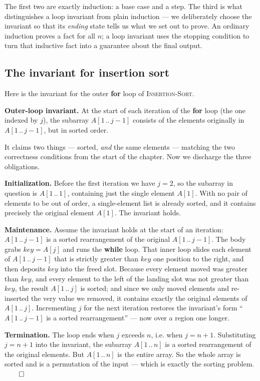 The first two are exactly induction: a base case and a step. The third is what
distinguishes a loop invariant from plain induction --- we deliberately choose the
invariant so that its \emph{ending} state tells us what we set out to prove. An
ordinary induction proves a fact for all $n$; a loop invariant uses the stopping
condition to turn that inductive fact into a guarantee about the final output.

\subsection{The invariant for insertion sort}

Here is the invariant for the outer \textbf{for} loop of \textsc{Insertion-Sort}.

\begin{formalbox}
\textbf{Outer-loop invariant.} At the start of each iteration of the \textbf{for} loop
(the one indexed by $j$), the subarray $A[1\,..\,j-1]$ consists of the elements
originally in $A[1\,..\,j-1]$, but in sorted order.
\end{formalbox}

It claims two things --- sorted, \emph{and} the same elements --- matching
the two correctness conditions from the start of the chapter. Now we discharge the three
obligations.

\begin{formalbox}
\textbf{Initialization.} Before the first iteration we have $j = 2$, so the subarray in
question is $A[1\,..\,1]$, containing just the single element $A[1]$. With no pair of
elements to be out of order, a single-element list is already sorted, and it contains
precisely the original element $A[1]$. The invariant holds.

\textbf{Maintenance.} Assume the invariant holds at the start of an iteration:
$A[1\,..\,j-1]$ is a sorted rearrangement of the original $A[1\,..\,j-1]$. The body
grabs $\mathit{key} = A[j]$ and runs the \textbf{while} loop. That inner loop slides
each element of $A[1\,..\,j-1]$ that is strictly greater than $\mathit{key}$ one
position to the right, and then deposits $\mathit{key}$ into the freed slot. Because
every element moved was greater than $\mathit{key}$, and every element to the left of
the landing slot was not greater than $\mathit{key}$, the result $A[1\,..\,j]$ is
sorted; and since we only moved elements and re-inserted the very value we removed, it
contains exactly the original elements of $A[1\,..\,j]$. Incrementing $j$ for the next
iteration restores the invariant's form ``$A[1\,..\,j-1]$ is a sorted rearrangement''
--- now over a region one longer.

\textbf{Termination.} The loop ends when $j$ exceeds $n$, i.e. when $j = n+1$.
Substituting $j = n+1$ into the invariant, the subarray $A[1\,..\,n]$ is a sorted
rearrangement of the original elements. But $A[1\,..\,n]$ is the entire array. So the
whole array is sorted and is a permutation of the input --- which is exactly the sorting
problem. $\qed$
\end{formalbox}

